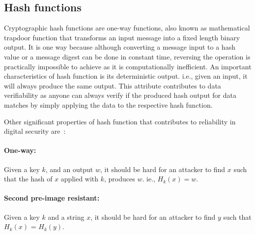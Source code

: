 \subsection{Hash functions}
Cryptographic hash functions are one-way functions, also known as mathematical
trapdoor function that transforms an input message into a fixed length binary
output. It is one way because although converting a message input to a hash
value or a message digest can be done in constant time, reversing the operation
is practically impossible to achieve as it is computationally inefficient. An
important characteristics of hash function is its deterministic output. i.e.,
given an input, it will always produce the same output. This attribute
contributes to data verifiability as anyone can always verify if the produced
hash output for data matches by simply applying the data to the respective hash
function. \par 
Other significant properties of hash function that contributes to
reliability in digital security are~\cite{mironov2005hash}: 
\paragraph{One-way:} Given a key $k$, and an output $w$, it should be hard for
an attacker to find $x$ such that the hash of $x$ applied with $k$, produces
$w$.  ie., $H_k(x) = w$.
\paragraph{Second pre-image resistant:} Given a key $k$ and a string $x$, it
should be hard for an attacker to find $y$ such that $H_k(x)$ = $H_k(y)$. 
